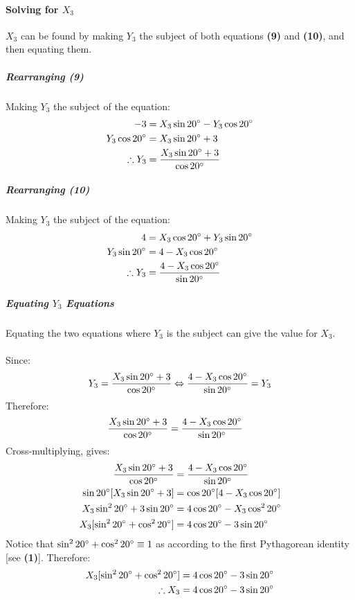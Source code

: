 \documentclass{article}
\begin{document}
            \paragraph{Solving for $X_3$} $X_3$ can be found by making $Y_3$ the subject of both equations \textbf{(9)} and \textbf{(10)}, and then equating them.
            \subparagraph{Rearranging (9)} Making $Y_3$ the subject of the equation:
            \begin{align*}
                -3 &= X_3\sin{20\degree} - Y_3\cos{20\degree} \\
                Y_3\cos{20\degree} &= X_3\sin{20\degree} + 3 \\
                \therefore Y_3 &= \frac{X_3\sin{20\degree} + 3}{\cos{20\degree}}
            \end{align*}
            \subparagraph{Rearranging (10)} Making $Y_3$ the subject of the equation:
            \begin{align*}
                4 &= X_3\cos{20\degree} + Y_3\sin{20\degree} \\
                Y_3\sin{20\degree} &= 4 - X_3\cos{20\degree} \\
                \therefore Y_3 &= \frac{4 - X_3\cos{20\degree}}{\sin{20\degree}}
            \end{align*}
            \subparagraph{Equating $Y_3$ Equations} Equating the two equations where $Y_3$ is the subject can give the value for $X_3$. \\\\ 
            Since:
            \begin{equation*}
                Y_3 = \frac{X_3\sin{20\degree} + 3}{\cos{20\degree}} \Leftrightarrow \frac{4 - X_3\cos{20\degree}}{\sin{20\degree}} = Y_3
            \end{equation*}
            Therefore:
            \begin{align*}
                \frac{X_3\sin{20\degree} + 3}{\cos{20\degree}} &= \frac{4 - X_3\cos{20\degree}}{\sin{20\degree}}
            \end{align*}
            Cross-multiplying, gives:
            \begin{align*}
            \frac{X_3\sin{20\degree} + 3}{\cos{20\degree}} &= \frac{4 - X_3\cos{20\degree}}{\sin{20\degree}} \\
            \sin{20\degree}[X_3\sin{20\degree} + 3] &= \cos{20\degree}[4 - X_3\cos{20\degree}] \\
            X_3\sin^2{20\degree} + 3\sin{20\degree} &= 4\cos{20\degree} - X_3\cos^2{20\degree} \\
            X_3[\sin^2{20\degree} + \cos^2{20\degree}] &= 4\cos{20\degree} - 3\sin{20\degree}
            \end{align*}
            Notice that $\sin^2{20\degree} + \cos^2{20\degree} \equiv 1$ as according to the first Pythagorean identity [see \textbf{(1)}]. Therefore:
            \begin{align*}
                X_3[\sin^2{20\degree} + \cos^2{20\degree}] &= 4\cos{20\degree} - 3\sin{20\degree} \\
                \therefore X_3 &= 4\cos{20\degree} - 3\sin{20\degree}
            \end{align*}
\end{document}
